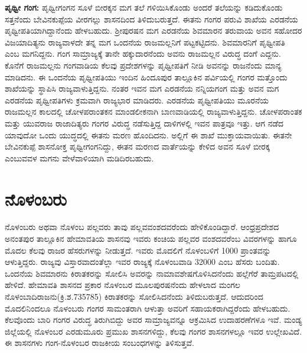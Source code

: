 \textbf{ಪೃಥ್ವೀ ಗಂಗ:} ಪೃಥ್ವೀಗಂಗನ ಸೂಳೆ ಬೀರಕ್ಕನ ಮಗ ತಲೆ ಗಳಿಯಿಸಿಕೊಂಡು ಅಂದರೆ ತಲೆಯನ್ನು ಕಡಿದುಕೊಂಡು ಸತ್ತನೆಂದು ಬೇವಿನಕುಪ್ಪೆಯ ವೀರಗಲ್ಲು ಶಾಸನದಿಂದ ತಿಳಿದುಬರುತ್ತದೆ. ಈತನು ಗಂಗರ ಪರುವಿ ಶಾಖೆಯ ಎರಡನೆಯ ಪೃಥ್ವೀಪತಿಯಾಗಿದ್ದಾನೆಂದು ಹೇಳಬಹುದು. ಶ‍್ರೀಪುರಷನ ಮಗ ಎರಡನೆಯ ಶಿವಮಾರನ ತರುವಾಯ ಅವನ ಸಹೋದರ ವಿಜಯಾದಿತ್ಯನು ರಾಜ್ಯವಾಳದೇ ತನ್ನ ಮಗ ಒಂದನೆಯ ರಾಜಮಲ್ಲನಿಗೆ ಪಟ್ಟಕಟ್ಟಿದನು. ಶಿವಮಾರನಿಗೆ ಪೃಥ್ವೀಪತಿ ಎಂಬ ಮಗನಿದ್ದನು. ಗಂಗ ಸಾಮ್ರಾಜ್ಯಕ್ಕೆ ತಾನೇ ಹಕ್ಕುದಾರನೆಂದು ಅವನು ರಾಜಮಲ್ಲನ ವಿರುದ್ಧ ದಂಗೆ ಎದ್ದನು. ಕೊನೆಗೆ ರಾಜಮಲ್ಲನು ಗಂಗವಾಡಿಯ ಕೆಲವು ಪ್ರದೇಶಗಳನ್ನು ಪೃಥ್ವೀಪತಿಗೆ ನೀಡಿ ಅವನನ್ನು ರಾಜನೆಂದು ಮಾನ್ಯ ಮಾಡಿದನು. ಈ ಒಂದನೆಯ ಪೃಥ್ವೀಪತಿಯು ಇಂದಿನ ಹಿಂದೂಪುರ ತಾಲ್ಲೂಕಿನ ಪರ್ವಿಯಲ್ಲಿ ಗಂಗರ ಮತ್ತೊಂದು ಶಾಖೆಯನ್ನು ಸ್ಥಾಪಿಸಿ ರಾಜ್ಯವಾಳುತ್ತಿದ್ದನು. ನಂತರ ಇವನ ಮಗ ಎರಡನೆಯ ನನ್ನಿಯಗಂಗ ಮತ್ತು ಅವನ ಮಗ ಎರಡನೆಯ ಪೃಥ್ವೀಪತಿಗಳು ಕ್ರಮವಾಗಿ ರಾಜ್ಯಭಾರ ಮಾಡಿದರು. ಎರಡನೆಯ ಪೃಥ್ವೀಪತಿಯು ಮೂರನೆಯ ರಾಜಮಲ್ಲನ ಕಾಲದಲ್ಲಿ ಚೋಳಪರಾಂತಕನ ಮಾಂಡಲೀಕನಾಗಿ ಬಾಣವಾಡಿಯಲ್ಲಿ ರಾಜ್ಯವಾಳುತ್ತಿದ್ದನು. ಚೋಳಪರಾಂತಕ ಮತ್ತು ಯುವರಾಜ ರಾಜಾದಿತ್ಯರು ಗಂಗರ ವಿರುದ್ಧ ನಡೆಸುತ್ತಿದ್ದ ದಾಳಿಗಳಲ್ಲಿ ಇವನ ಪಾತ್ರವೂ ಇತ್ತು. ಆಗ ನಡೆದ ಯಾವುದೋ ಒಂದು ಯುದ್ಧದಲ್ಲಿ ಈತನು ಮರಣ ಹೊಂದಿದನು. ಅಲ್ಲಿಗೆ ಈ ಶಾಖೆ ಮುಕ್ತಾಯವಾಯಿತು. ಈತನೇ ಬೇವಿನಕುಪ್ಪೆ ಶಾಸನೋಕ್ತ ಪೃಥ್ವೀಗಂಗನಿದ್ದು, ಈತನ ಮರಣದ ವಾರ್ತೆಯನ್ನು ಕೇಳಿದ ಅವನ ಸೂಳೆ ಬೀರಕ್ಕ ಎಂಬುವವಳ ಮಗನು ವೇಳೆವಾಳಿಯಾಗಿ ಮಡಿದಿರಬಹುದು.


\section{ನೊಳಂಬರು}

ನೊಳಂಬರು ಅಥವಾ ನೊಳಂಬ ಪಲ್ಲವರು ತಾವು ಪಲ್ಲವವಂಶದವರೆಂದು ಹೇಳಿಕೊಂಡಿದ್ದಾರೆ. ಆಂಧ್ರಪ್ರದೇಶದ ಅನಂತಪುರ ತಾಲ್ಲೂಕಿನ ಹೇಮಾವತಿಯ ಶಾಸನವು ಇವರು ಕಂಚಿಯ ಪಲ್ಲವರ ವಂಶದವರೆಂಬ ವಿವರಗಳನ್ನು ಹಾಗೂ ಮೊದಲ ಕೆಲವು ರಾಜರ ಹೆಸರುಗಳನ್ನು ನೀಡುತ್ತದೆ. ಇವರು ಮೊದಲಿಗೆ ನೊಳಂಬಳಿಗೆ 1000 ಪ್ರಾಂತವನ್ನು ಆಳುತ್ತಿದ್ದರು. ರಾಜ್ಯವು ವಿಸ್ತಾರವಾದಂತೆಲ್ಲಾ ಇವರ ರಾಜ್ಯಕ್ಕೆ ನೊಳಂಬವಾಡಿ 32000 ಎಂಬ ಹೆಸರು ಬಂದಿತು. ಒಂದನೆಯ ಶಿವಮಾರನು ಕಿರಾತಕರನ್ನು ಸೋಲಿಸಿ ಅವರನ್ನು ನಾಮಾವಶೇಷಗೊಳಿಸಿದನೆಂದು ಹಲ್ಲೆಗೆರೆ ತಾಮ್ರಪಟದಲ್ಲಿ ಹೇಳಿದೆ. ಹೇಮಾವತಿ ಶಾಸನದ ಪ್ರಕಾರ ನೊಳಂಬರ ಮೂಲಪುರಷನೆಂದು ಹೇಳಲಾದ ಮಂಗಲ ನೊಳಂಬಾದಿರಾಜನು(ಕ್ರಿ.ಶ.735\enginline{-}785) ಕಿರಾತಕರನ್ನು ಸೋಲಿಸಿದನೆಂದು ತಿಳಿದುಬರುತ್ತದೆ. ಆದುದರಿಂದ ಮೊದಲಿನಿಂದಲೂ ನೊಳಂಬರು ಗಂಗರ ಸಾಮಂತರಾಗಿ ಆಳುತ್ತಾ ಅವರಿಗೆ ಸಹಾಯಕರಾಗಿದ್ದರೆಂದು ಹೇಳಬಹುದು. ಕೆಲವೊಂದು ಬಾರಿ ಗಂಗರ ವಿರುದ್ಧ ತಿರುಗಿಬಿದ್ದು ಅವರ ಸಾಮ್ರಾಜ್ಯವನ್ನೂ ಆಕ್ರಮಿಸಿದ ಉದಾಹರಣೆಗಳೂ ಇವೆ. ಮಂಡ್ಯ ಜಿಲ್ಲೆಯಲ್ಲಿ ನೊಳಂಬರ ಎರಡುಮೂರು ಪ್ರಮುಖ ಶಾಸನಗಳಿದ್ದು, ಕೆಲವು ಗಂಗರ ಶಾಸನಗಳಲ್ಲೂ ಇವರ ಉಲ್ಲೇಖವಿದೆ. ಈ ಶಾಸನಗಳು ಗಂಗ-ನೊಳಂಬರ ರಾಜಕೀಯ ಸಂಬಂಧಗಳನ್ನು ತಿಳಿಸುತ್ತವೆ.

